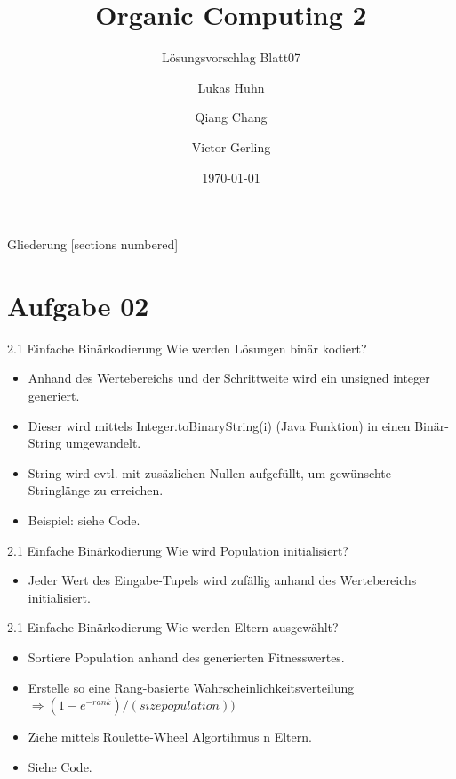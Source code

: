 \documentclass{ocbeameruni}
\title{Organic Computing 2}
\subtitle{Lösungsvorschlag Blatt07}
\date{\today}
\author{Lukas Huhn \and Qiang Chang \and Victor Gerling}
\institute{%
  Universität Augsburg\\
  Institut für Informatik\\
  Lehrstuhl für Organic Computing
}
\begin{document}
\maketitle


\begin{frame}{Gliederung}
  [sections numbered]
  \tableofcontents
\end{frame}


\section{Aufgabe 02}

\begin{frame}{2.1 Einfache Binärkodierung}
Wie werden Lösungen binär kodiert? 
    \begin{itemize}
    \item Anhand des Wertebereichs und der Schrittweite wird ein unsigned integer generiert.
    \item Dieser wird mittels Integer.toBinaryString(i) (Java Funktion) in einen Binär-String umgewandelt.
    \item String wird evtl. mit zusäzlichen Nullen aufgefüllt, um gewünschte Stringlänge zu erreichen.
    \item Beispiel: siehe Code.
    \end{itemize}
\end{frame}

\begin{frame}{2.1 Einfache Binärkodierung}
Wie wird Population initialisiert? 
    \begin{itemize}
    \item Jeder Wert des Eingabe-Tupels wird zufällig anhand des Wertebereichs initialisiert.
    \end{itemize}
\end{frame}

\begin{frame}{2.1 Einfache Binärkodierung}
Wie werden Eltern ausgewählt? 
    \begin{itemize}
    \item Sortiere Population anhand des generierten Fitnesswertes.
    \item Erstelle so eine Rang-basierte Wahrscheinlichkeitsverteilung $\Rightarrow (1 - e^{- rank}) / (size population))$
    \item Ziehe mittels Roulette-Wheel Algortihmus n Eltern.
    \item Siehe Code.
    \end{itemize}
\end{frame}
\end{document}
